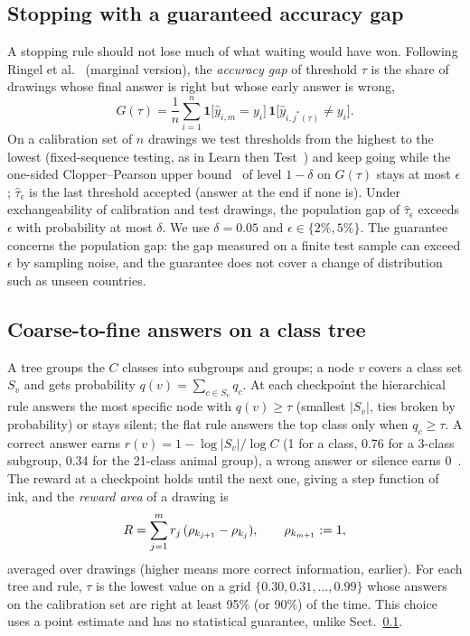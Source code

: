 \subsection{Stopping with a guaranteed accuracy gap}
\label{sec:method-risk}
A stopping rule should not lose much of what waiting would have won. Following Ringel et
al.~\cite{ringel2024early} (marginal version), the \emph{accuracy gap} of threshold $\tau$ is the
share of drawings whose final answer is right but whose early answer is wrong,
\begin{equation}
G(\tau) = \frac{1}{n}\sum_{i=1}^{n} \mathbf{1}\big[\hat y_{i,m} = y_i\big]\,
\mathbf{1}\big[\hat y_{i,j^\ast(\tau)} \ne y_i\big].
\end{equation}
On a calibration set of $n$ drawings we test thresholds from the highest to the lowest
(fixed-sequence testing, as in Learn then Test~\cite{angelopoulos2021ltt}) and keep going while the
one-sided Clopper--Pearson upper bound~\cite{clopper1934} of level $1-\delta$ on $G(\tau)$ stays at
most $\epsilon$; $\hat\tau_\epsilon$ is the last threshold accepted (answer at the end if none is).
Under exchangeability of calibration and test drawings, the population gap of $\hat\tau_\epsilon$
exceeds $\epsilon$ with probability at most $\delta$. We use $\delta = 0.05$ and
$\epsilon \in \{2\%, 5\%\}$. The guarantee concerns the population gap: the gap measured on a finite
test sample can exceed $\epsilon$ by sampling noise, and the guarantee does not cover a change of
distribution such as unseen countries.

\subsection{Coarse-to-fine answers on a class tree}
\label{sec:method-tree}
A tree groups the $C$ classes into subgroups and groups; a node $v$ covers a class set $S_v$ and
gets probability $q(v) = \sum_{c \in S_v} q_c$. At each checkpoint the hierarchical rule answers the
most specific node with $q(v) \ge \tau$ (smallest $|S_v|$, ties broken by probability) or stays
silent;
the flat rule answers the top class only when $q_c \ge \tau$. A correct answer earns
$r(v) = 1 - \log|S_v|/\log C$ (1 for a class, 0.76 for a 3-class subgroup, 0.34 for the 21-class
animal group), a wrong answer or silence earns 0~\cite{deng2012hedging}. The reward at a checkpoint
holds until the next one, giving a step function of ink, and the \emph{reward area} of a drawing is
\begin{equation}
R = \sum_{j=1}^{m} r_j\,(\rho_{k_{j+1}} - \rho_{k_j}), \qquad \rho_{k_{m+1}} := 1,
\end{equation}
averaged over drawings (higher means more correct information, earlier). For each tree and rule,
$\tau$ is the lowest value on a grid $\{0.30, 0.31, \dots, 0.99\}$ whose answers on the calibration
set are right at least 95\% (or 90\%) of the time. This choice uses a point estimate and has no
statistical guarantee, unlike Sect.~\ref{sec:method-risk}.

